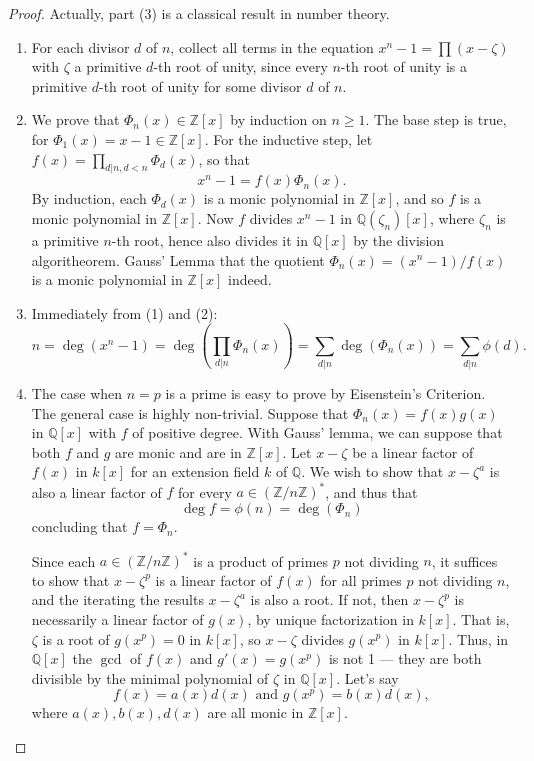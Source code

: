 \documentclass[12pt]{report}
\theoremstyle{definition}
\newcommand{\ZZ}{\mathbb{Z}}
\newcommand{\QQ}{\mathbb{Q}}
\begin{document}
\begin{proof}
	Actually, part (3) is a classical result in number theory.
	\begin{enumerate}
		\item For each divisor $d$ of $n$, collect all terms in the equation $x^n- 1 = \prod(x- \zeta)$ with $\zeta$ a primitive $d$-th root of unity, since every $n$-th root of unity is a primitive $d$-th root of unity for some divisor $d$ of $n$.
		\item We prove that $\Phi_n(x) \in  \ZZ[x]$ by induction on $n \geq  1$. The base step is true, for $\Phi_1(x) = x- 1 \in  \ZZ[x]$. For the inductive step, let $f(x) =\prod_{d|n,d<n} \Phi_d(x)$, so that $$x^n - 1 = f(x)\Phi_n(x).$$
		      By induction, each $\Phi_d(x)$ is a monic polynomial in $\ZZ[x]$, and so $f$ is a monic polynomial in $\ZZ[x]$. Now $f$ divides $x^n-1$ in $\QQ(\zeta_n)[x]$, where $\zeta_n$ is a primitive $n$-th root, hence also divides it in $\QQ[x]$ by the division algoritheorem. Gauss' Lemma that the quotient $\Phi_n(x)=(x^n- 1)/f(x)$ is a monic polynomial in $\ZZ[x]$ indeed.
		\item Immediately from (1) and (2):
		      $$n=\deg(x^n-1)=\deg(\prod_{d|n}\Phi_n(x))=\sum_{d|n}\deg(\Phi_n(x))=\sum_{d|n} \phi(d).$$
		\item The case when $n=p$ is a prime is easy to prove by Eisenstein's Criterion. The general case is highly non-trivial.
		      Suppose that $\Phi_n(x) = f(x)g(x)$ in $\QQ[x]$ with $f$ of positive degree. With Gauss' lemma, we can suppose that both $f$ and $g$ are monic and are in $\ZZ[x]$. Let $x - \zeta$ be a linear factor of $f(x)$ in $k[x]$ for an extension field $k$ of $\QQ$. We wish to show that $x - \zeta^a$ is also a linear factor of $f$ for every $a \in (\ZZ/n\ZZ)^*$, and thus that $$ \deg f = \phi(n) = \deg (\Phi_n)$$ concluding that $f = \Phi_n$.

		      Since each $a \in (\ZZ/n\ZZ)^*$ is a product of primes $p$ not dividing $n$, it suffices to show that $x - \zeta^p$ is a linear factor of $f(x)$ for all primes $p$ not dividing $n$, and the iterating the results $x-\zeta^a$ is also a root. If not, then $x - \zeta^p$ is necessarily a linear factor of $g(x)$, by unique factorization in $k[x]$. That is, $\zeta$ is a root of $g(x^p) = 0$ in $k[x]$, so $x - \zeta$ divides $g(x^p)$ in $k[x]$.
		      Thus, in $\QQ[x]$ the $\gcd$ of $f(x)$ and $g'(x)=g(x^p)$ is not 1 --- they are both divisible by the minimal polynomial of $\zeta$ in $\QQ[x]$. Let's say
		      $$f(x)=a(x)d(x) \mbox{ and } g(x^p)=b(x)d(x),$$ where $a(x),b(x),d(x)$ are all monic in $\ZZ[x]$.


\end{enumerate}
\end{proof}
\end{document}
